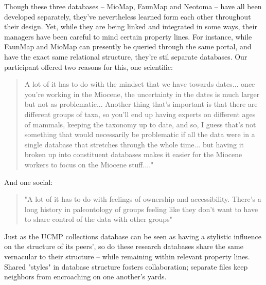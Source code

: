 Though these three databases -- MioMap, FaunMap and Neotoma -- have all been developed separately, they've nevertheless learned form each other throughout their design. Yet, while they are being linked and integrated in some ways, their managers have been careful to mind certain property lines.  For instance, while FaunMap and MioMap can presently be queried through the same portal, and have the exact same relational structure, they're stil separate databases.  Our participant offered two reasons for this, one scientific:
\begin{quote}
A lot of it has to do with the mindset that we have towards dates... once you're working in the Miocene, the uncertainty in the dates is much larger but not as problematic... Another thing that's important is that there are different groups of taxa, so you'll end up having experts on different ages of mammals, keeping the taxonomy up to date, and so, I guess that's not something that would necessarily be problematic if all the data were in a single database that stretches through the whole time... but having it broken up into constituent databases makes it easier for the Miocene workers to focus on the Miocene stuff...."
\end{quote}
And one social:
\begin{quote}
"A lot of it has to do with feelings of ownership and accessibility. There's a long history in paleontology of groups feeling like they don't want to have to share control of the data with other groups"
\end{quote}
Just as the UCMP collections database can be seen as having a stylistic influence on the structure of its peers', so do these research databases share the same vernacular to their structure -- while remaining within relevant property lines. Shared "styles" in database structure fosters collaboration; separate files keep neighbors from encroaching on one another's yards.

